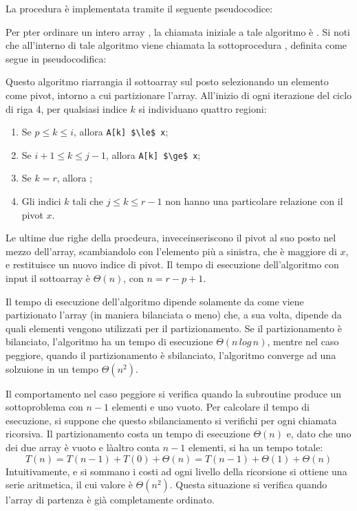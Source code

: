 La procedura  è implementata tramite il seguente pseudocodice:



Per pter ordinare un intero array , la chiamata iniziale a tale algoritmo è . Si noti che all'interno di tale algoritmo viene chiamata la sottoprocedura , definita come segue in pseudocodifica:



Questo algoritmo riarrangia il sottoarray  sul posto selezionando un elemento  come pivot, intorno a cui partizionare l'array. All'inizio di ogni iterazione del ciclo  di riga 4, per qualsiasi indice \(k\) si individuano quattro regioni:
\begin{enumerate}
  \item Se \(p\le k\le i\), allora \lstinline[mathescape]{A[k] $\le$ x};
  \item Se \(i+1\le k \le j-1\), allora \lstinline[mathescape]{A[k] $\ge$ x};
  \item Se \(k=r\), allora ;
  \item Gli indici \(k\) tali che \(j \le k \le r-1\) non hanno una particolare relazione con il pivot \(x\).
\end{enumerate}

Le ultime due righe della procdeura, inveceinseriscono il pivot al suo posto nel mezzo dell'array, scambiandolo con l'elemento più a sinistra, che è maggiore di \(x\), e restituisce un nuovo indice di pivot. Il tempo di esecuzione dell'algoritmo  con input il sottoarray  è \(\Theta(n)\), con \(n=r-p+1\).

Il tempo di esecuzione dell'algoritmo  dipende solamente da come viene partizionato l'array (in maniera bilanciata o meno) che, a sua volta, dipende da quali elementi vengono utilizzati per il partizionamento. Se il partizionamento è bilanciato, l'algoritmo ha un tempo di esecuzione \(\Theta(n\,log\,n)\), mentre nel caso peggiore, quando il partizionamento è sbilanciato, l'algoritmo converge ad una solzuione in un tempo \(\Theta(n^2)\).

\vspace*{10pt}

Il comportamento nel caso peggiore si verifica quando la subroutine  produce un sottoproblema con \(n-1\) elementi e uno vuoto. Per calcolare il tempo di esecuzione, si suppone che questo sbilanciamento si verifichi per ogni chiamata ricorsiva. Il partizionamento costa un tempo di esecuzione \(\Theta(n)\) e, dato che uno dei due array è vuoto e làaltro conta \(n-1\) elementi, si ha un tempo totale:
\begin{equation*}
  T(n) = T(n-1) + T(0) + \Theta(n) = T(n-1) + \Theta(1) + \Theta(n)
\end{equation*}
Intuitivamente, e si sommano i costi ad ogni livello della ricorsione si ottiene una serie aritmetica, il cui valore è \(\Theta(n^2)\). Questa situazione si verifica quando l'array di partenza è già completamente ordinato. 

